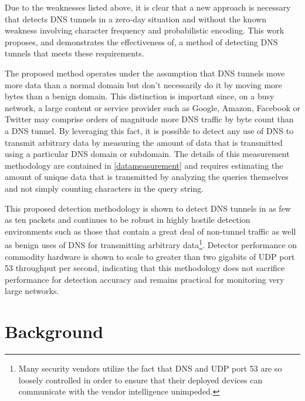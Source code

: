 \documentclass[12pt]{report}
\theoremstyle{remark}
\theoremstyle{definition}
\theoremstyle{definition}
\theoremstyle{definition}
\begin{document}
Due to the weaknesses listed above, it is clear that a new approach is
necessary that detects DNS tunnels in a zero-day situation and without the known 
weakness involving character frequency and probabilistic encoding. This work
proposes, and demonstrates the effectiveness of, a method of detecting DNS
tunnels that meets these requirements.

The proposed method operates under the assumption that DNS tunnels move more
data than a normal domain but don't necessarily do it by moving more bytes than
a benign domain. This distinction is important since, on a busy network, a large
content or service provider such as Google, Amazon, Facebook or Twitter may
comprise orders of magnitude more DNS traffic by byte count than a DNS tunnel.
By leveraging this fact, it is possible to detect
any use of DNS to transmit arbitrary data by measuring the amount of data that
is transmitted using a particular DNS domain or subdomain. The details of this
measurement methodology are contained in \ref{datameasurement} and requires
estimating the amount of unique data that is transmitted by analyzing the
queries themselves and not simply counting characters in the query string.

This proposed detection methodology is shown to detect DNS tunnels in as few as
ten packets and continues to be robust in highly hostile detection environments
such as those that contain a great deal of non-tunnel traffic as well as benign
uses of DNS for transmitting arbitrary data\footnote{Many security vendors
utilize the fact that DNS and UDP port 53 are so loosely controlled in order to
ensure that their deployed devices can communicate with the vendor intelligence
unimpeded.}. Detector performance on commodity hardware is shown to scale to
greater than two gigabits of UDP port 53 throughput per second, indicating that
this methodology does not sacrifice performance for detection accuracy and
remains practical for monitoring very large networks.

\newpage

\chapter{Background}
\end{document}
